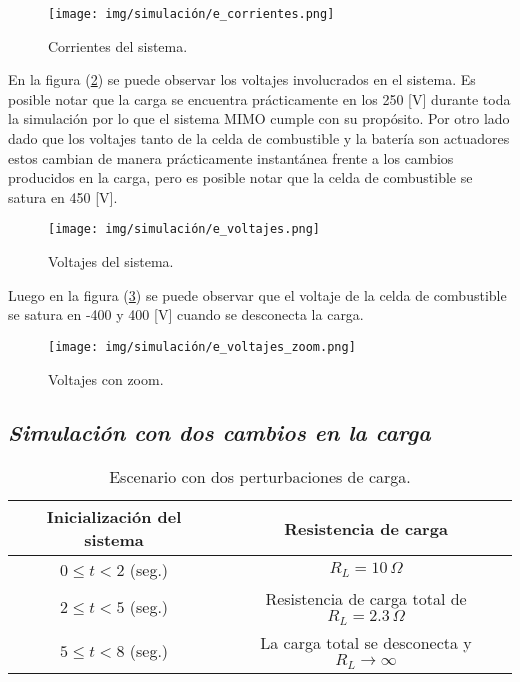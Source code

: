 \begin{figure}[H]
    \centering
    \texttt{[image: img/simulación/e\_corrientes.png]}
    \caption{Corrientes del sistema.}
    \label{fig:e_corrientes}
\end{figure}

En la figura (\ref{fig:e_voltajes}) se puede observar los voltajes involucrados
en el sistema. Es posible notar que la carga se encuentra prácticamente en 
los 250 [V] durante toda la simulación por lo que el sistema MIMO cumple con 
su propósito. Por otro lado dado que los voltajes tanto de la celda de 
combustible y la batería son actuadores estos cambian de manera prácticamente
instantánea frente a los cambios producidos en la carga, pero es posible notar
que la celda de combustible se satura en 450 [V].

\begin{figure}[H]
    \centering
    \texttt{[image: img/simulación/e\_voltajes.png]}
    \caption{Voltajes del sistema.}
    \label{fig:e_voltajes}
\end{figure}

Luego en la figura (\ref{fig:e_voltajes_zoom}) se puede observar que el 
voltaje de la celda de combustible se satura en -400 y 400 [V] cuando se
desconecta la carga.

\begin{figure}[H]
    \centering
    \texttt{[image: img/simulación/e\_voltajes\_zoom.png]}
    \caption{Voltajes con zoom.}
    \label{fig:e_voltajes_zoom}
\end{figure}



\subsection{\textit{Simulación con dos cambios en la carga}}

\begin{table}[H]
    \centering
    \begin{tabular}{|c|c|}
    \hline
    \textbf{Inicialización del sistema} & \textbf{Resistencia de carga} \\
    \hline
    $0 \leq t < 2$ (seg.) & $R_L = 10\,\Omega$ \\
    \hline
    $2 \leq t < 5$ (seg.) & Resistencia de carga total de $R_L = 2.3\,\Omega$ \\
    \hline
    $5 \leq t < 8$ (seg.) & La carga total se desconecta y $R_L \rightarrow \infty$ \\
    \hline
\end{tabular}
\caption{Escenario con dos perturbaciones de carga.}
\label{tab:f}
\end{table}


